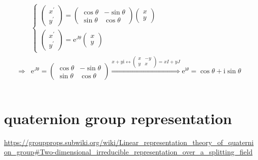 \documentclass[
]{book}
\theoremstyle{definition}
\theoremstyle{definition}
\theoremstyle{definition}
\theoremstyle{definition}
\theoremstyle{remark}
\begin{document}
\[
\begin{aligned}
 & \begin{cases}
\begin{pmatrix}x^{\prime}\\
y^{\prime}
\end{pmatrix}=\begin{pmatrix}\cos\theta & -\sin\theta\\
\sin\theta & \cos\theta
\end{pmatrix}\begin{pmatrix}x\\
y
\end{pmatrix}\\
\begin{pmatrix}x^{\prime}\\
y^{\prime}
\end{pmatrix}=\mathrm{e}^{J\theta}\begin{pmatrix}x\\
y
\end{pmatrix}
\end{cases}\\
\Rightarrow & \mathrm{e}^{J\theta}=\begin{pmatrix}\cos\theta & -\sin\theta\\
\sin\theta & \cos\theta
\end{pmatrix}\overset{x+y\mathrm{i}\leftrightarrow\begin{pmatrix}x & -y\\
y & x
\end{pmatrix}=xI+yJ}{\Rightarrow}\mathrm{e}^{\mathrm{i}\theta}=\cos\theta+\mathrm{i}\sin\theta
\end{aligned}
\]

\[
\ \tag*{$\Box$}
\]

\hypertarget{quaternion-group-representation}{%
\section{quaternion group representation}\label{quaternion-group-representation}}

\url{https://groupprops.subwiki.org/wiki/Linear_representation_theory_of_quaternion_group\#Two-dimensional_irreducible_representation_over_a_splitting_field}
\end{document}
